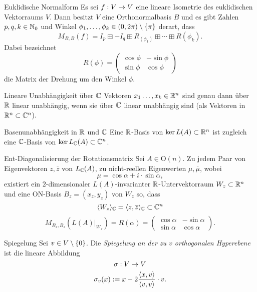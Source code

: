 \documentclass[main.tex]{subfiles}
\begin{document}
\begin{karte}{Euklidische Normalform}
    Es sei \( f : V \rightarrow V \) eine lineare 
    Isometrie des euklidischen Vektorraums \(V\). 
    Dann besitzt \(V\) eine Orthonormalbasis \(B\)
    und es gibt Zahlen \(p, q, k \in \mathbb{N}_0\) und 
    Winkel \( \phi_1,\ldots, \phi_k \in (0,2\pi)
    \setminus \{\pi\} \) derart, dass 
    \[ M_{B,B}(f) = I_p \boxplus -I_q 
    \boxplus R_(\phi_1) \boxplus \cdots \boxplus R(\phi_k). \]
    Dabei bezeichnet 
    \[ R(\phi) = \begin{pmatrix}
        \cos \phi & -\sin \phi \\
        \sin \phi & \cos \phi
    \end{pmatrix} \]
    die Matrix der Drehung um den Winkel \( \phi \).
\end{karte}

\begin{karte}{Lineare Unabhängigkeit über \(\mathbb{C}\)}
    Vektoren \( x_1\ldots, x_k \in \mathbb{R}^n \) sind 
    genau dann über \( \mathbb{R} \) linear unabhängig, 
    wenn sie über \(\mathbb{C}\) linear unabhängig sind 
    (als Vektoren in \( \mathbb{R}^n \subset \mathbb{C}^n \)).
\end{karte}

\begin{karte}{Basenunabhängigkeit in \(\mathbb{R}\) und \(\mathbb{C}\)}
    Eine \(\mathbb{R}\)-Basis von \( \ker L(A) \subset \mathbb{R}^n \) 
    ist zugleich eine \( \mathbb{C} \)-Basis von \( \ker L_{\mathbb{C}} (A)\subset \mathbb{C}^n \).
\end{karte}

\begin{karte}{Ent-Diagonalisierung der Rotationsmatrix}
    Sei \(A \in \mathrm{O}(n)\). Zu jedem Paar von 
    Eigenvektoren \( z,\overline{z} \) von \( L_{\mathbb{C}}(A) \), 
    zu nicht-reellen Eigenwerten \( \mu, \overline{\mu} \), 
    wobei 
    \[ \mu = \cos \alpha + i \cdot \sin \alpha, \]
    existiert ein \(2\)-dimensionaler \( L(A) \)-invarianter 
    \( \mathbb{R} \)-Untervektorraum \( W_z \subset \mathbb{R}^n \) und 
    eine ON-Basis \( B_z = (x_z, y_z) \) von \( W_z \) 
    so, dass 
    \[ \langle W_z \rangle_{\mathbb{C}} = \langle z, \overline{z}\rangle_{\mathbb{C}} \subset \mathbb{C}^n \]
    \[ M_{B_z,B_z}(L(A)\vert_{W_z}) = R(\alpha)
    = \begin{pmatrix}
        \cos \alpha & -\sin \alpha \\
        \sin \alpha & \cos \alpha
    \end{pmatrix}. \]
\end{karte}

\begin{karte}{Spiegelung}
    Sei \( v\in V\setminus \{0\} \). Die 
    \textit{Spiegelung an der zu \(v\) orthogonalen Hyperebene} 
    ist die lineare Abbildung 
    \[ \sigma : V \rightarrow V \]
    \[ \sigma_v(x) := x - 2\frac{\langle x, v \rangle}{\langle v, v \rangle} \cdot v. \]
\end{karte}
\end{document}
